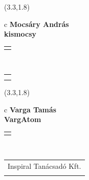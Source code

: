 \documentclass[11pt]{article}
\begin{document}
\makebox(3.3,1.8){
  \renewcommand\arraystretch{1.3}
  \begin{tabular}[c]{c}
    \hspace{8.5mm}
    \LARGE\bf{ Mocsáry András }\\
    \hspace{8.5mm}
    \Large{ kismocsy }\\
    \renewcommand\arraystretch{3}
    \begin{tabular}[c]{c}
      \centering
      \fontfamily{phv}\selectfont{
        \textbf{
          \textsc{
            \scriptsize{
            \color{Dark}{ Ismerkedő }\color{Dark}{ Webmester }\color{Dark}{ Sminkmester }\color{Dark}{ Programozó }
            }
          }
        }
      }
    \end{tabular}
    \\
    \renewcommand\arraystretch{1}
    \begin{tabular}{p{3.3in}}
      \hspace{.7cm}\\
      \hspace{.7cm}\emph{  }\\
    \end{tabular}
  \end{tabular}
}

\makebox(3.3,1.8){
  \renewcommand\arraystretch{1.3}
  \begin{tabular}[c]{c}
    \hspace{8.5mm}
    \LARGE\bf{ Varga Tamás }\\
    \hspace{8.5mm}
    \Large{ VargAtom }\\
    \renewcommand\arraystretch{3}
    \begin{tabular}[c]{c}
      \centering
      \fontfamily{phv}\selectfont{
        \textbf{
          \textsc{
            \scriptsize{
            \color{Dark}{ Ismerkedő }\color{Bright}{ Webmester }\color{Bright}{ Sminkmester }\color{Bright}{ Programozó }
            }
          }
        }
      }
    \end{tabular}
    \\
    \renewcommand\arraystretch{1}
    \begin{tabular}{p{3.3in}}
      \hspace{.7cm}Inspiral Tanácsadó Kft.\\
      \hspace{.7cm}\emph{  }\\
    \end{tabular}
  \end{tabular}
}
\end{document}
